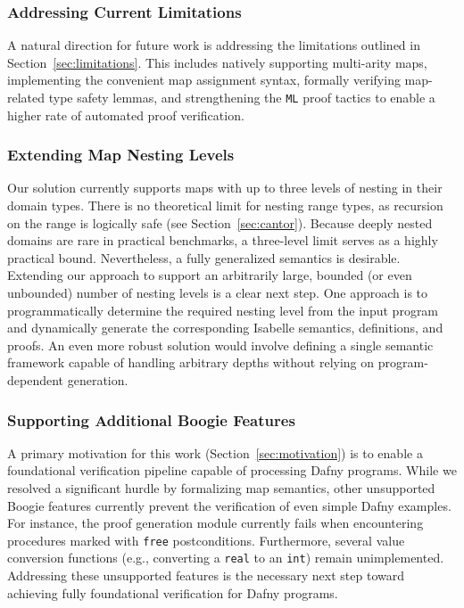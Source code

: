 \documentclass[11pt]{article}
\begin{document}
\subsubsection{Addressing Current Limitations}

A natural direction for future work is addressing the limitations outlined in Section~\ref{sec:limitations}.
This includes natively supporting multi-arity maps, implementing the convenient map assignment syntax,
formally verifying map-related type safety lemmas,
and strengthening the \texttt{ML} proof tactics to enable a higher rate of automated proof verification.

\subsubsection{Extending Map Nesting Levels}

Our solution currently supports maps with up to three levels of nesting in their domain types.
There is no theoretical limit for nesting range types, as recursion on the range is logically safe (see Section~\ref{sec:cantor}).
Because deeply nested domains are rare in practical benchmarks, a three-level limit serves as a highly practical bound.
Nevertheless, a fully generalized semantics is desirable.
Extending our approach to support an arbitrarily large, bounded (or even unbounded) number of nesting levels is a clear next step.
One approach is to programmatically determine the required nesting level from the input program
and dynamically generate the corresponding Isabelle semantics, definitions, and proofs.
An even more robust solution would involve defining a single semantic framework capable of handling arbitrary depths without relying on program-dependent generation.

\subsubsection{Supporting Additional Boogie Features}

A primary motivation for this work (Section~\ref{sec:motivation}) is to enable a foundational verification pipeline capable of processing Dafny programs.
While we resolved a significant hurdle by formalizing map semantics, other unsupported Boogie features currently prevent the verification of even simple Dafny examples.
For instance, the proof generation module currently fails when encountering procedures marked with \texttt{free} postconditions.
Furthermore, several value conversion functions (e.g., converting a \texttt{real} to an \texttt{int}) remain unimplemented.
Addressing these unsupported features is the necessary next step toward achieving fully foundational verification for Dafny programs.
\end{document}
